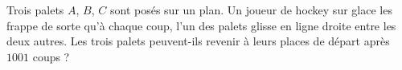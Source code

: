 Trois palets $A$, $B$, $C$ sont posés sur un plan. Un joueur de hockey sur glace les frappe de sorte qu'à chaque coup, l'un des palets glisse en ligne droite entre les deux autres. Les trois palets peuvent-ils revenir à leurs places de départ après $1001$ coups ?
